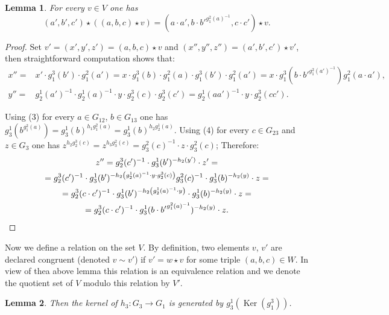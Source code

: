 \documentclass[oneside, 10pt]{amsart}
\DeclareMathOperator{\Ker}{Ker}
\numberwithin{equation}{section}
\newtheorem{lemma}{Lemma}
\numberwithin{lemma}{section}
\theoremstyle{definition}
\theoremstyle{remark}
\begin{document}
\begin{lemma} For every $v \in V$ one has 
 \begin{equation*}(a', b', c') \star \left( (a, b, c) \star v \right) = (a \cdot a', b \cdot {b'}^{g_1^2(a)^{-1}}, c \cdot c') \star v.\end{equation*}
\end{lemma}
\begin{proof}
Set $v'=(x', y', z') = (a, b, c) \star v$ and $(x'', y'', z'') = (a', b', c') \star v'$, then straightforward computation shows that:
\begin{align*} 
 x'' =& x' \cdot g_1^3(b') \cdot g_1^2(a') = x \cdot g_1^3(b) \cdot g_1^2(a) \cdot g_1^3(b') \cdot g_1^2(a') = x \cdot g_1^3(b \cdot b'^{g_1^2(a')^{-1}}) g_1^2(a \cdot a'),\\
 y'' =& g_2^1(a')^{-1} \cdot g_2^1(a)^{-1} \cdot y \cdot g_2^3(c) \cdot g_2^3(c') = g_2^1(aa')^{-1} \cdot y \cdot g_2^3(cc'). \end{align*}

Using (3) for every $a \in G_{12}$, $b \in G_{13}$ one has $g_3^1(b^{g_1^2(a)}) = g_3^1(b)^{h_1 g_1^2(a)} = g_3^1(b)^{h_2g_2^1(a)}$.
Using (4) for every $c \in G_{23}$ and $z \in G_3$ one has $z ^{h_2 g_2^3(c)} = z^{ h_3 g_3^2(c)} = g_3^2(c)^{-1} \cdot z \cdot g_3^2(c)$;
Therefore:
\begin{multline*}
  z'' = g_2^3(c')^{-1} \cdot g_3^1(b')^{-h_2(y')} \cdot z' = \\ 
  = g_2^3(c')^{-1} \cdot g_3^1(b')^{- h_2 \left( g_2^1(a)^{-1} \cdot y \cdot g_2^3(c) \right)} g_3^2(c)^{-1} \cdot g_3^1(b)^{-h_2(y)} \cdot z = \\
  = g_2^3(c \cdot c')^{-1} \cdot g_3^1(b')^{- h_2 \left( g_2^1(a)^{-1} \cdot y \right)} \cdot g_3^1(b)^{-h_2(y)} \cdot z = \\
  = g_2^3(c \cdot c')^{-1} \cdot g_3^1(b \cdot {b'} ^ {g_1^2(a)^{-1}})^{- h_2 \left( y \right)} \cdot z. \qedhere
\end{multline*}
\end{proof}

Now we define a relation on the set $V$.
By definition, two elements $v$, $v'$ are declared congruent (denoted $v \sim v'$)
 if $v' = w \star v$ for some triple $(a, b, c) \in W$. In view of thea above lemma this relation is an equivalence relation
 and we denote the quotient set of $V$ modulo this relation by $V'$.
 
\begin{lemma}
 Then the kernel of $h_3\colon G_3\to G_1$ is generated by $g_3^1(\Ker(g_1^3))$.
\end{lemma}
\end{document}
